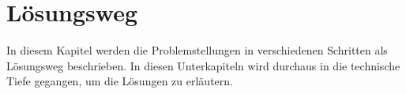 \section{Lösungsweg} \label{sec:projektbericht-loesungsweg}

In diesem Kapitel werden die Problemstellungen in verschiedenen Schritten als Lösungsweg beschrieben.
In diesen Unterkapiteln wird durchaus in die technische Tiefe gegangen, um die Lösungen zu erläutern.





\newpage


